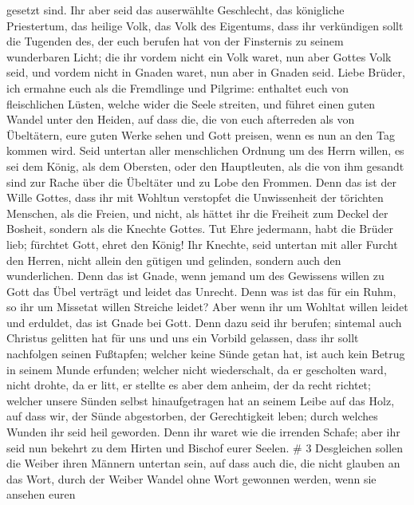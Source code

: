 gesetzt sind.  Ihr aber seid das auserwählte Geschlecht, das
königliche Priestertum, das heilige Volk, das Volk des Eigentums, dass
ihr verkündigen sollt die Tugenden des, der euch berufen hat von der
Finsternis zu seinem wunderbaren Licht;  die ihr vordem
nicht ein Volk waret, nun aber Gottes Volk seid, und vordem nicht in
Gnaden waret, nun aber in Gnaden seid.  Liebe Brüder, ich
ermahne euch als die Fremdlinge und Pilgrime: enthaltet euch von
fleischlichen Lüsten, welche wider die Seele streiten,  und
führet einen guten Wandel unter den Heiden, auf dass die, die von euch
afterreden als von Übeltätern, eure guten Werke sehen und Gott preisen,
wenn es nun an den Tag kommen wird.  Seid untertan aller
menschlichen Ordnung um des Herrn willen, es sei dem König, als dem
Obersten,  oder den Hauptleuten, als die von ihm gesandt
sind zur Rache über die Übeltäter und zu Lobe den Frommen. 
Denn das ist der Wille Gottes, dass ihr mit Wohltun verstopfet die
Unwissenheit der törichten Menschen,  als die Freien, und
nicht, als hättet ihr die Freiheit zum Deckel der Bosheit, sondern als
die Knechte Gottes.  Tut Ehre jedermann, habt die Brüder
lieb; fürchtet Gott, ehret den König!  Ihr Knechte, seid
untertan mit aller Furcht den Herren, nicht allein den gütigen und
gelinden, sondern auch den wunderlichen.  Denn das ist
Gnade, wenn jemand um des Gewissens willen zu Gott das Übel verträgt und
leidet das Unrecht.  Denn was ist das für ein Ruhm, so ihr
um Missetat willen Streiche leidet? Aber wenn ihr um Wohltat willen
leidet und erduldet, das ist Gnade bei Gott.  Denn dazu
seid ihr berufen; sintemal auch Christus gelitten hat für uns und uns
ein Vorbild gelassen, dass ihr sollt nachfolgen seinen Fußtapfen;
 welcher keine Sünde getan hat, ist auch kein Betrug in
seinem Munde erfunden;  welcher nicht wiederschalt, da er
gescholten ward, nicht drohte, da er litt, er stellte es aber dem
anheim, der da recht richtet;  welcher unsere Sünden selbst
hinaufgetragen hat an seinem Leibe auf das Holz, auf dass wir, der Sünde
abgestorben, der Gerechtigkeit leben; durch welches Wunden ihr seid heil
geworden.  Denn ihr waret wie die irrenden Schafe; aber ihr
seid nun bekehrt zu dem Hirten und Bischof eurer Seelen. \# 3
 Desgleichen sollen die Weiber ihren Männern untertan sein,
auf dass auch die, die nicht glauben an das Wort, durch der Weiber
Wandel ohne Wort gewonnen werden,  wenn sie ansehen euren
